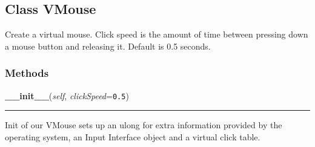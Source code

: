 \subsection{Class VMouse}

    \label{GUIRobot:Source:Virtual_HID:VMouse}
Create a virtual mouse. Click speed is the amount of time between pressing 
down a mouse button and releasing it. Default is 0.5 seconds.



  \subsubsection{Methods}

    \label{GUIRobot:Source:Virtual_HID:VMouse:__init__}

    \vspace{0.5ex}

\hspace{.8\funcindent}\begin{boxedminipage}{\funcwidth}

    \raggedright \textbf{\_\_init\_\_}(\textit{self}, \textit{clickSpeed}={\tt 0.5})

    \vspace{-1.5ex}

    \rule{\textwidth}{0.5\fboxrule}
\setlength{\parskip}{2ex}
    Init of our VMouse sets up an ulong for extra information provided by 
    the operating system, an Input Interface object and a virtual click 
    table.

\setlength{\parskip}{1ex}
    \end{boxedminipage}

    \label{GUIRobot:Source:Virtual_HID:VMouse:getCoord}

    \vspace{0.5ex}

